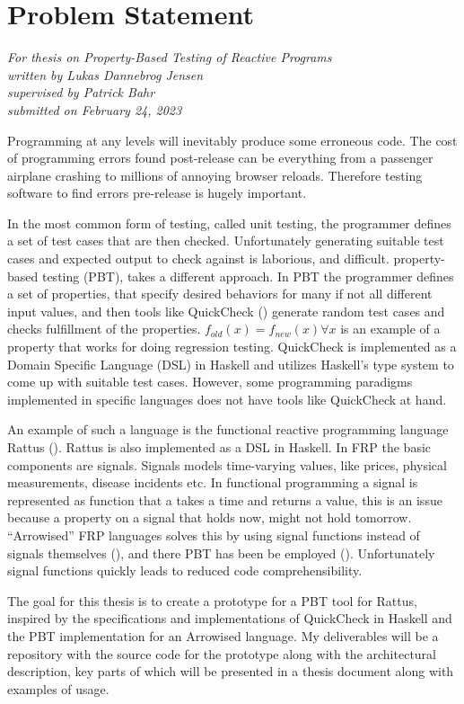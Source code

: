 \section*{Problem Statement}
\thispagestyle{empty}
\textit{For thesis on Property-Based Testing of Reactive Programs}\\
\textit{written by Lukas Dannebrog Jensen}\\
\textit{supervised by Patrick Bahr}\\
\textit{submitted on February 24, 2023} \par
Programming at any levels will inevitably produce some erroneous code. The cost of programming errors found post-release can be everything from a passenger airplane crashing  to millions of annoying browser reloads. Therefore testing software to find errors pre-release is hugely important. \par 
In the most common form of testing, called unit testing, the programmer defines a set of test cases that are then checked. Unfortunately generating suitable test cases and expected output to check against is laborious, and difficult.
property-based testing (PBT), takes a different approach. In PBT the programmer defines a set of properties, that specify desired behaviors for many if not all different input values, and then tools like QuickCheck (\cite{quickCheck}) generate random test cases and checks fulfillment of the properties. $f_{old} (x) = f_{new} (x) \forall x $ is an example of a property that works for doing regression testing.
QuickCheck is implemented as a Domain Specific Language (DSL) in Haskell and utilizes Haskell’s type system to come up with suitable test cases. However, some programming paradigms implemented in specific languages does not have tools like QuickCheck at hand. \par
An example of such a language is the functional reactive programming language Rattus (\cite{rattus}). Rattus is also implemented as a DSL in Haskell. In FRP the basic components are signals. Signals models time-varying values, like prices,  physical measurements, disease incidents etc. In functional programming a signal is represented as function that a takes a time and returns a value, this is an issue because a property on a signal that holds now, might not hold tomorrow. 
“Arrowised” FRP languages solves this by using signal functions instead of signals themselves (\cite{yampa}), and there PBT has been be employed (\cite{runtimeVerification}). Unfortunately signal functions quickly leads to reduced code comprehensibility. \par
The goal for this thesis is to create a prototype for a PBT tool for Rattus, inspired by the specifications and implementations of QuickCheck in Haskell and the PBT implementation for an Arrowised language.
My deliverables will be a repository with the source code for the prototype along with the architectural description, key parts of which will be presented in a thesis document along with examples of usage.

